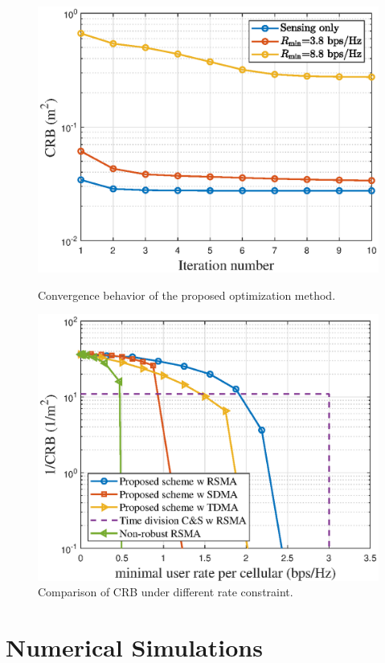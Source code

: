 \documentclass[twocolumn,journal]{IEEEtran}
\begin{document}
\begin{figure}[htbp]
  \centering
  \begin{minipage}{0.3\textwidth}
    \centering
    \includegraphics[width=\linewidth]{figure/1_figConv.eps}
    \caption{Convergence behavior of the proposed optimization method.}
    \label{fig:Conv}
  \end{minipage}
  \hfill
  \begin{minipage}{0.3\textwidth}
    \centering
    \includegraphics[width=\linewidth]{figure/2_figRate_CRB.eps}
    \caption{Comparison of CRB under different rate constraint.}
    \label{fig:image2}
  \end{minipage}
\end{figure}
\section{Numerical Simulations}

\printbibliography 
\end{document}

